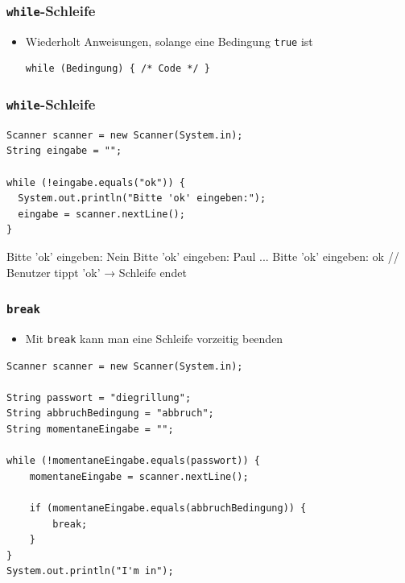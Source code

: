 \documentclass{../../presentation}
\begin{document}
\begin{frame}[fragile]
	\frametitle{\texttt{while}-Schleife}
	\pause
	\begin{itemize}
		\item  Wiederholt Anweisungen, solange eine Bedingung \texttt{true} ist
		      \begin{verbatim}
while (Bedingung) { /* Code */ }
        \end{verbatim}
	\end{itemize}
\end{frame}

\begin{frame}[fragile]
	\frametitle{\texttt{while}-Schleife}
	\pause
	\begin{verbatim}
Scanner scanner = new Scanner(System.in);
String eingabe = "";

while (!eingabe.equals("ok")) {
  System.out.println("Bitte 'ok' eingeben:");
  eingabe = scanner.nextLine();
}
  \end{verbatim}
	\pause
	\begin{ausgabe}
		Bitte 'ok' eingeben: Nein\newline
		Bitte 'ok' eingeben: Paul\newline
		...\newline
		Bitte 'ok' eingeben: ok\newline
		// Benutzer tippt 'ok' → Schleife endet
	\end{ausgabe}
\end{frame}

\begin{frame}[fragile]
	\frametitle{\texttt{break}}
	\pause
	\begin{itemize}
		\item Mit \texttt{break} kann man eine Schleife vorzeitig beenden
	\end{itemize}
	\pause
	\begin{verbatim}
Scanner scanner = new Scanner(System.in);

String passwort = "diegrillung";
String abbruchBedingung = "abbruch";
String momentaneEingabe = "";

while (!momentaneEingabe.equals(passwort)) {
    momentaneEingabe = scanner.nextLine();

    if (momentaneEingabe.equals(abbruchBedingung)) {
        break;
    }
}
System.out.println("I'm in");
\end{verbatim}
\end{frame}
\end{document}
